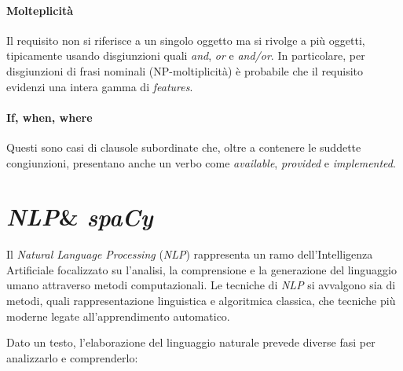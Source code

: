 \documentclass[12pt]{report}
\newcommand{\spacy}{\textsl{spaCy}\xspace}
\newcommand{\nlp}{\textsl{NLP}\xspace}
\begin{document}
\subsubsection{Molteplicità}
Il requisito non si riferisce a un singolo oggetto ma si rivolge a più oggetti, tipicamente usando disgiunzioni quali \textit{and}, \textit{or} e \textit{and/or}. In particolare, per disgiunzioni di frasi nominali (NP-moltiplicità) è probabile che il requisito evidenzi una intera gamma di \textit{features}.


\subsubsection{If, when, where}
Questi sono casi di clausole subordinate che, oltre a contenere le suddette congiunzioni, presentano anche un verbo come \textit{available}, \textit{provided} e \textit{implemented}.






\chapter{\nlp \& \spacy}
\label{ch:nlp}
Il \textit{Natural Language Processing} (\nlp) rappresenta un ramo dell'Intelligenza Artificiale focalizzato su l'analisi, la comprensione e la generazione del linguaggio umano attraverso metodi computazionali. Le tecniche di \nlp si avvalgono sia di metodi, quali rappresentazione linguistica e algoritmica classica, che tecniche più moderne legate all'apprendimento automatico.

Dato un testo, l'elaborazione del linguaggio naturale prevede diverse fasi per analizzarlo e comprenderlo:
\end{document}
